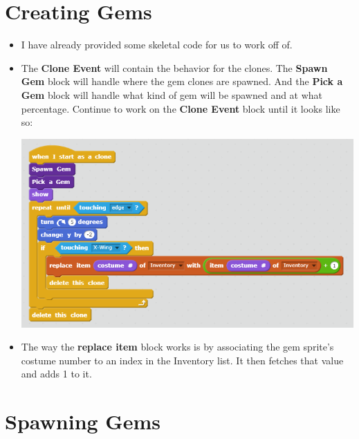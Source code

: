 \documentclass[12pt]{article}
\begin{document}
	
	
	 

	







\section *{Creating Gems}
	
	\begin{itemize}
		\item I have already provided some skeletal code for us to work off of. 
		\item The \textbf{Clone Event} will contain the behavior for the clones. The \textbf{Spawn Gem} block will handle where the gem clones are spawned. And the \textbf{Pick a Gem} block will handle what kind of gem will be spawned and at what percentage. Continue to work on the \textbf{Clone Event} block until it looks like so:
		\begin{center}
    		\includegraphics[scale = 0.5]{./Images/Gem_Clone_2.png}
		\end{center}
		\item The way the \textbf{replace item} block works is by associating the gem sprite's costume number to an index in the Inventory list. It then fetches that value and adds 1 to it.
	\end{itemize}



 










\section *{Spawning Gems}
\end{document}
